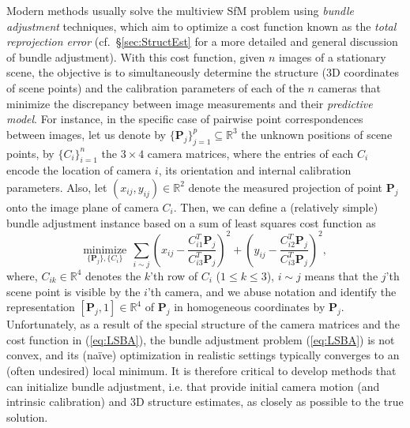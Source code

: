 \documentclass[10pt]{article}
\newcommand{\R}{\ensuremath{\mathbb{R}}}
\begin{document}
Modern methods usually solve the multiview SfM problem using \textit{bundle adjustment} techniques, which aim to optimize a cost function known as the \textit{total reprojection error} (cf.~\S\ref{sec:StructEst} for a more detailed and general discussion of bundle adjustment). With this cost function, given $n$ images of a stationary scene, the objective is to simultaneously determine the structure ($3$D coordinates of scene points) and the calibration parameters of each of the $n$ cameras that minimize the discrepancy between image measurements and their \textit{predictive model}. For instance, in the specific case of pairwise point correspondences between images, let us denote by $\{\mathbf{P}_j\}_{j=1}^p\subseteq\R^3$ the unknown positions of scene points, by $\{C_i\}_{i=1}^n$ the $3 \times 4$ camera matrices, where the entries of each $C_i$ encode the location of camera $i$, its orientation and internal calibration parameters. Also, let $(x_{ij},y_{ij})\in\R^2$ denote the measured projection of point $\mathbf{P}_j$ onto the image plane of camera $C_i$. Then, we can define a (relatively simple) bundle adjustment instance based on a sum of least squares cost function as
\begin{equation}
\label{eq:LSBA}
\underset{{\scriptstyle \{\mathbf{P}_j\}, \{C_i\}}}{\text{minimize}}  \ \ \sum_{i\sim j} \left(x_{ij} - \frac{C_{i1}^T\mathbf{P}_j}{C_{i3}^T\mathbf{P}_j} \right)^2 + \left(y_{ij} -  \frac{C_{i2}^T\mathbf{P}_j}{C_{i3}^T\mathbf{P}_j} \right)^2,
\end{equation}
where, $C_{ik}\in\R^4$ denotes the $k$'th row of $C_i$ ($1 \le k \le 3$), $i\sim j$ means that the $j$'th scene point is visible by the $i$'th camera, and we abuse notation and identify the representation $[\mathbf{P}_j, 1]\in\R^4$ of $\mathbf{P}_j$ in homogeneous coordinates by $\mathbf{P}_j$. Unfortunately, as a result of the special structure of the camera matrices and the cost function in (\ref{eq:LSBA}), the bundle adjustment problem (\ref{eq:LSBA}) is not convex, and its (na\"{i}ve) optimization in realistic settings typically converges to an (often undesired) local minimum. It is therefore critical to develop methods that can initialize bundle adjustment, i.e. that provide initial camera motion (and intrinsic calibration) and $3$D structure estimates, as closely as possible to the true solution.
\end{document}

